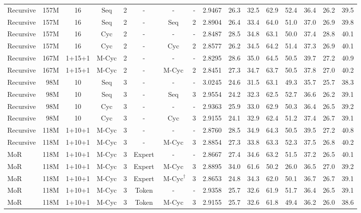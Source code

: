 \begin{table}[h]
{\begin{tabular}{l|cc|cc|c|cc|c|cccccc|c}
    \midrule
    Recursive & 157M & 16 & Seq & 2 & - & - & - & 2.9467 & 26.3 & 32.5 & 62.9 & 52.4 & 36.4 & 26.2 & 39.5\\
    Recursive &157M  & 16 & Seq & 2 & - & Seq & 2 & 2.8904 & 26.4 & 33.4 & 64.0 & 51.0 & 37.0 & 26.9 & 39.8\\
    Recursive & 157M & 16 & Cyc & 2 & - & - & - & 2.8487 & 28.5 & 34.8 & 63.1 & 50.0 & 37.4 & 28.8 & 40.1\\
    Recursive & 157M & 16 & Cyc & 2 & - & Cyc & 2 & 2.8577 & 26.2 & 34.5 & 64.2 & 51.4 & 37.3 & 26.9 & 40.1\\
    \rowcolor[gray]{0.9}
    Recursive & 167M & 1+15+1 & M-Cyc & 2 & - & - & - & 2.8295 & 28.6 & 35.0 & 64.5 & 50.5 & 39.7 & 27.2 & 40.9\\
    Recursive & 167M & 1+15+1 & M-Cyc & 2 & - & M-Cyc & 2 & 2.8451 & 27.3 &	34.7 & 63.7 & 50.5 & 37.8 & 27.0 & 40.2 \\
    \midrule
    Recursive & \,\,\,98M & 10 & Seq & 3 & - & - & - & 3.0245 & 24.6 & 31.5 & 63.1 & 49.3 & 35.7 & 25.7 & 38.3\\
    Recursive & \,\,\,98M & 10 & Seq & 3 & - & Seq & 3 & 2.9554 & 24.2 & 32.3 & 62.5 & 52.7 & 36.6 & 26.2 & 39.1\\
    Recursive & \,\,\,98M & 10 & Cyc & 3 & - & - & - & 2.9363 & 25.9 & 33.0 & 62.9 & 50.3 & 36.4 & 26.5 & 39.2\\
    Recursive & \,\,\,98M & 10 & Cyc & 3 & - & Cyc & 3 & 2.9155 & 24.1 & 32.9 & 62.4 & 51.2 & 37.4 & 26.7 & 39.1 \\
    \rowcolor[gray]{0.9}
    Recursive & 118M & 1+10+1 & M-Cyc & 3 & - & - & - & 2.8760 & 28.5 & 34.9 & 64.3 & 50.5 & 39.5 & 27.2 & 40.8\\
    Recursive & 118M & 1+10+1 & M-Cyc & 3 & - & M-Cyc & 3 & 2.8854 & 27.3 &	33.8 & 63.3 & 52.3 & 37.5 & 26.8 &	40.2\\
    \midrule
    \rowcolor[gray]{0.9}
    MoR & 118M & 1+10+1 & M-Cyc & 3 & Expert & - & - & 2.8667 & 27.4 & 34.6 & 63.2 & 51.5 & 37.2 & 26.5 & 40.1\\
    MoR & 118M & 1+10+1 & M-Cyc & 3 & Expert & M-Cyc & 3 & 2.8895 & 34.0 & 	61.6 & 50.2 & 26.0 & 36.5 & 27.0 & 39.2 \\
    MoR & 118M & 1+10+1 & M-Cyc & 3 & Expert & \,\,$\text{M-Cyc}^{\dagger}$ & 3 & 2.8653 & 24.8 & 34.3 & 62.0 & 50.1 & 36.7 & 26.7 & 39.1\\
    \midrule
    \rowcolor[gray]{0.9}
    MoR & 118M & 1+10+1 & M-Cyc & 3 & Token & - & - & 2.9358 & 25.7 & 32.6 & 61.9 & 51.7 & 36.4 & 26.5 & 39.1\\
    MoR & 118M & 1+10+1 & M-Cyc & 3 & Token & M-Cyc & 3 & 2.9155& 25.7 & 32.6 &	61.8 & 49.4 & 36.2 & 26.0 & 38.6\\
    \bottomrule
    \end{tabular}
    }
\end{table}